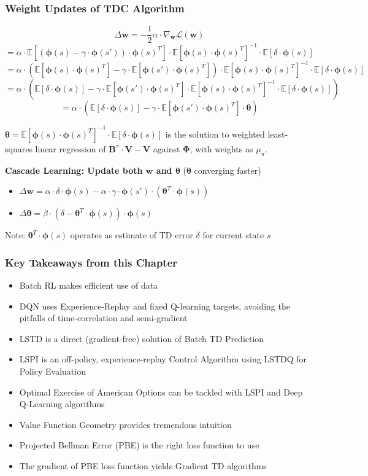 \documentclass[handout]{beamer}
\newcommand{\bphi}{\bm{\Phi}}
\newcommand{\bb}{\bm{B}^{\pi}}
\newcommand{\bv}{\bm{V}}
\newcommand{\bw}{\bm{w}}
\newcommand{\btheta}{\bm{\theta}}
\begin{document}
\begin{frame}
\frametitle{Weight Updates of TDC Algorithm}
\pause
$$\Delta \bw  = - \frac {1} {2} \alpha \cdot \nabla_{\bw} \mathcal{L}({\bw})$$
$$ = \alpha \cdot \mathbb{E}[(\bm{\phi}(s) - \gamma \cdot \bm{\phi}(s')) \cdot \bm{\phi}(s)^T] \cdot \mathbb{E}[\bm{\phi}(s) \cdot \bm{\phi}(s)^T]^{-1} \cdot \mathbb{E}[\delta \cdot \bm{\phi}(s)]$$
$$ = \alpha \cdot (\mathbb{E}[\bm{\phi}(s) \cdot \bm{\phi}(s)^T] - \gamma \cdot \mathbb{E}[\bm{\phi}(s') \cdot \bm{\phi}(s)^T]) \cdot \mathbb{E}[\bm{\phi}(s) \cdot \bm{\phi}(s)^T]^{-1} \cdot \mathbb{E}[\delta \cdot \bm{\phi}(s)]$$
$$ = \alpha \cdot (\mathbb{E}[\delta \cdot \bm{\phi}(s)] - \gamma \cdot \mathbb{E}[\bm{\phi}(s') \cdot \bm{\phi}(s)^T] \cdot \mathbb{E}[\bm{\phi}(s) \cdot \bm{\phi}(s)^T]^{-1} \cdot \mathbb{E}[\delta \cdot \bm{\phi}(s)])$$
$$ = \alpha \cdot (\mathbb{E}[\delta \cdot \bm{\phi}(s)] - \gamma \cdot \mathbb{E}[\bm{\phi}(s') \cdot \bm{\phi}(s)^T] \cdot \btheta)$$
\pause
\vspace*{2mm}

$\btheta = \mathbb{E}[\bm{\phi}(s) \cdot \bm{\phi}(s)^T]^{-1} \cdot \mathbb{E}[\delta \cdot \bm{\phi}(s)]$ is the solution to weighted least-squares linear regression of $\bb \cdot \bv - \bv$ against $\bphi$, with weights as $\mu_{\pi}$.
\pause
\vspace*{3mm}

{\bf Cascade Learning: Update both $\bw$ and $\btheta$} ($\btheta$ converging faster)
\pause
\begin{itemize}[<+->]
\item $\Delta \bw = \alpha \cdot \delta \cdot \bm{\phi}(s)  - \alpha \cdot \gamma \cdot \bm{\phi}(s') \cdot (\btheta^T \cdot \bm{\phi}(s))$
\item $\Delta \btheta = \beta \cdot (\delta - \btheta^T \cdot \bm{\phi}(s)) \cdot \bm{\phi}(s)$
\end{itemize}
\pause
Note: $\btheta^T \cdot \bm{\phi}(s)$ operates as estimate of TD error $\delta$ for current state $s$
\end{frame}

\begin{frame}
\frametitle{Key Takeaways from this Chapter}
\pause
\begin{itemize}[<+->]
\item Batch RL makes efficient use of data
\item DQN uses Experience-Replay and fixed Q-learning targets, avoiding the pitfalls of time-correlation and semi-gradient
\item LSTD is a direct (gradient-free) solution of Batch TD Prediction
\item LSPI is an off-policy, experience-replay Control Algorithm using LSTDQ for Policy Evaluation
\item Optimal Exercise of American Options can be tackled with LSPI and Deep Q-Learning algorithms
\item Value Function Geometry provides tremendous intuition
\item Projected Bellman Error (PBE) is the right loss function to use
\item The gradient of PBE loss function yields Gradient TD algorithms
\end{itemize}
\end{frame}
\end{document}
